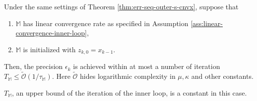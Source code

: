 \documentclass[12pt]{article}
\begin{document}
            \begin{proposition}\label{prop:inner-loop-complexity-s-cnvx}
                Under the same settings of Theorem \ref{thm:err-seq-outer-s-cnvx}, suppose that 
                \begin{enumerate}
                    \item $\mathbb M$ has linear convergence rate as specified in Assumption \ref{ass:linear-convergence-inner-loop}, 
                    \item $\mathbb M$ is initialized with  $z_{k, 0} = x_{k - 1}$. 
                \end{enumerate}
                Then, the precision $\epsilon_k$ is achieved within at most a number of iteration $T_{\mathbb M} \le \widetilde {\mathcal O}(1/ \tau_{\mathbb M})$. 
                Here $\widetilde{\mathcal O}$ hides logarithmic complexity in $\mu, \kappa$ and other constants. 
            \end{proposition}
            \begin{remark}
                $T_{\mathbb M}$, an upper bound of the iteration of the inner loop, is a constant in this case. 
            \end{remark}
\end{document}
